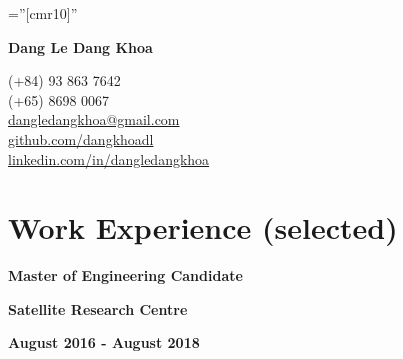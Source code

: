 \documentclass[10pt]{article}
\begin{document}
    \pagestyle{empty}       %
    \font\fb=''[cmr10]''    %

    \begin{multicols}{2}
        \begin{flushleft}
            \textbf{{\Huge Dang Le Dang Khoa }}
        \end{flushleft}

        \columnbreak

        \begin{flushright}
            \textsc (+84) 93 863 7642 \\
            \textsc (+65) 8698 0067 \\
            \href{mailto:dangledangkhoa@gmail.com}{dangledangkhoa@gmail.com} \\
            \href{https://github.com/dangkhoadl}{github.com/dangkhoadl} \\
            \href{https://sg.linkedin.com/in/dangledangkhoa}{linkedin.com/in/dangledangkhoa}
        \end{flushright}
    \end{multicols}


    \vspace{-12mm}
    \section{Work Experience (selected)}
        \vspace{-5mm}

        \begin{multicols}{3}
            \begin{flushleft}
                \textbf{Master of Engineering Candidate}
            \end{flushleft}

            \columnbreak

            \begin{center}
                \textbf{Satellite Research Centre}
            \end{center}

            \columnbreak

            \begin{flushright}
                \textbf{August 2016 - August 2018}
            \end{flushright}
        \end{multicols}
\end{document}
